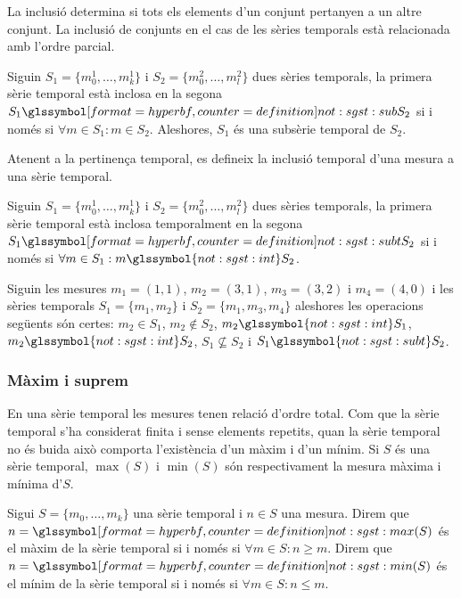 La inclusió determina si tots els elements d'un conjunt pertanyen a un
altre conjunt. La inclusió de conjunts en el cas de les sèries
temporals està relacionada amb l'ordre parcial.
\begin{definition}[Inclusió]
  Siguin $S_1=\{m_0^1,\ldots,m_k^1\}$ i $S_2=\{m_0^2,\ldots,m_l^2\}$
  dues sèries temporals, la primera sèrie temporal està inclosa en la
  segona $S_1 \glssymboldef{not:sgst:sub} S_2$ si i només si $\forall
  m \in S_1: m \in S_2$. Aleshores, $S_1$ és una subsèrie temporal de
  $S_2$.
\end{definition}



Atenent a la pertinença temporal, es defineix la inclusió temporal
d'una mesura a una sèrie temporal.
\begin{definition}
  Siguin $S_1=\{m_0^1,\ldots,m_k^1\}$ i $S_2=\{m_0^2,\ldots,m_l^2\}$
  dues sèries temporals, la primera sèrie temporal està inclosa
  temporalment en la segona $S_1 \glssymboldef{not:sgst:subt} S_2$ si
  i només si $\forall m \in S_1: m \glssymbol{not:sgst:int} S_2$.
\end{definition}




\begin{example}
  Siguin les mesures $m_1=(1,1)$, $m_2=(3,1)$, $m_3=(3,2)$ i
  $m_4=(4,0)$ i les sèries temporals $S_1=\{m_1,m_2\}$ i
  $S_2=\{m_1,m_3,m_4\}$ aleshores les operacions següents són certes:
  $m_2 \in S_1$, $m_2 \notin S_2$, $m_2 \glssymbol{not:sgst:int} S_1$,
  $m_2 \glssymbol{not:sgst:int} S_2$, $S_1\not\subseteq S_2$ i
  $S_1\glssymbol{not:sgst:subt} S_2$.
\end{example}

\subsubsection{Màxim i suprem}


En una sèrie temporal les mesures tenen relació d'ordre total. Com que
la sèrie temporal s'ha considerat finita i sense elements repetits,
quan la sèrie temporal no és buida això comporta l'existència d'un
màxim i d'un mínim.  Si $S$ és una sèrie temporal, $\max(S)$ i
$\min(S)$ són respectivament la mesura màxima i mínima d'$S$.

\begin{definition}
  Sigui $S=\{m_0,\ldots,m_k\}$ una sèrie temporal i $n\in S$ una
  mesura.  Direm que $n=\glssymboldef{not:sgst:max}(S)$ és el màxim de
  la sèrie temporal si i només si $\forall m \in S: n \geq m $.  Direm
  que $n=\glssymboldef{not:sgst:min}(S)$ és el mínim de la sèrie
  temporal si i només si $\forall m \in S: n \leq m$.
\end{definition}

